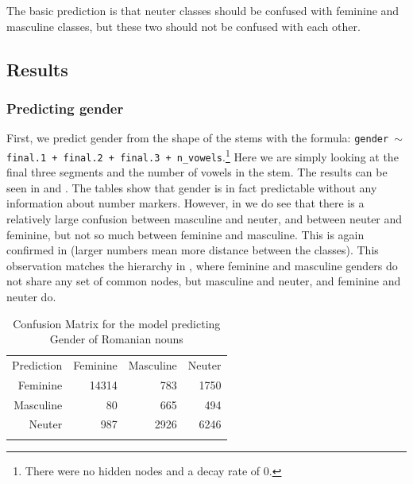 The basic prediction is that neuter classes should be confused with feminine and masculine classes, but these two should not be confused with each other.

\subsection{Results}

\subsubsection{Predicting gender}

First, we predict gender from the shape of the stems with the formula: \texttt{gender $\sim$ final.1 + final.2 + final.3 + n\_vowels}.\footnote{There were no hidden nodes and a decay rate of 0.} Here we are simply looking at the final three segments and the number of vowels in the stem. The results can be seen in  and . The tables show that gender is in fact predictable without any information about number markers. However, in  we do see that there is a relatively large confusion between masculine and neuter, and between neuter and feminine, but not so much between feminine and masculine. This is again confirmed in  (larger numbers mean more distance between the classes). This observation matches the hierarchy in , where feminine and masculine genders do not share any set of common nodes, but masculine and neuter, and feminine and neuter do.

\begin{table}
  \centering
  \begin{tabular}{rrrr}
    \lsptoprule
    \multicolumn{4}{c}{Reference}              \\
    \midrule
    Prediction & Feminine & Masculine & Neuter \\
    Feminine   & 14314    & 783       & 1750   \\
    Masculine  & 80       & 665       & 494    \\
    Neuter     & 987      & 2926      & 6246   \\
    \lspbottomrule
  \end{tabular}
  \caption{Confusion Matrix for the model predicting Gender of Romanian nouns}\label{tab:gender-romanian}
\end{table}

